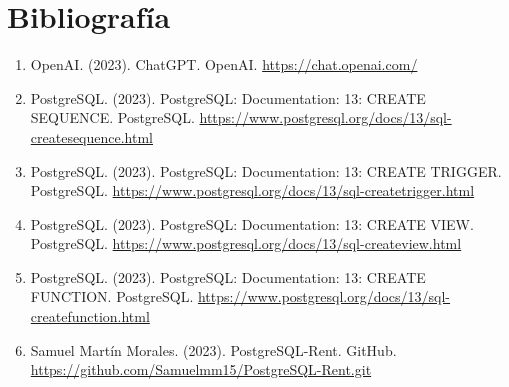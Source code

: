 \documentclass[10pt]{report}
\begin{document}
	\chapter{Bibliografía}
	\begin{enumerate}
		\item OpenAI. (2023). ChatGPT. OpenAI. \url{https://chat.openai.com/}
		\item PostgreSQL. (2023). PostgreSQL: Documentation: 13: CREATE SEQUENCE. PostgreSQL. \url{https://www.postgresql.org/docs/13/sql-createsequence.html}
		\item PostgreSQL. (2023). PostgreSQL: Documentation: 13: CREATE TRIGGER. PostgreSQL. \url{https://www.postgresql.org/docs/13/sql-createtrigger.html}
		\item PostgreSQL. (2023). PostgreSQL: Documentation: 13: CREATE VIEW. PostgreSQL. \url{https://www.postgresql.org/docs/13/sql-createview.html}
		\item PostgreSQL. (2023). PostgreSQL: Documentation: 13: CREATE FUNCTION. PostgreSQL. \url{https://www.postgresql.org/docs/13/sql-createfunction.html}
		\item Samuel Martín Morales. (2023). PostgreSQL-Rent. GitHub. \url{https://github.com/Samuelmm15/PostgreSQL-Rent.git}
	\end{enumerate}	
\end{document}
